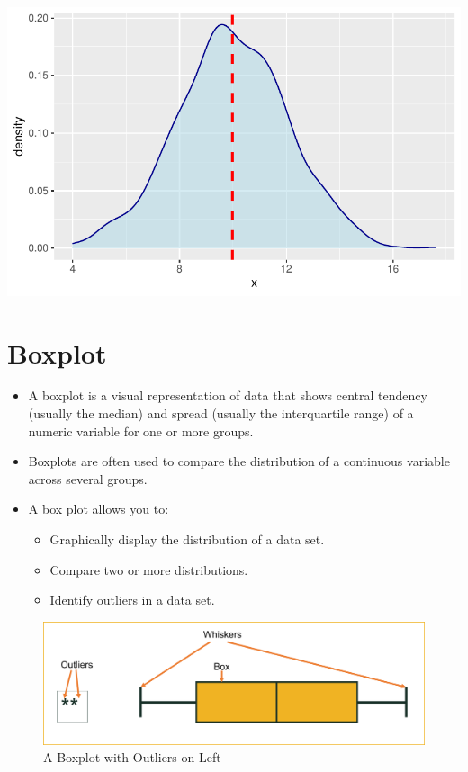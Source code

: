 \documentclass[
  letterpaper,
  DIV=11,
  numbers=noendperiod]{scrreprt}
\providecommand{\tightlist}{%
  \setlength{\itemsep}{0pt}\setlength{\parskip}{0pt}}\usepackage{longtable,booktabs,array}
\begin{document}
\includegraphics{dataviz_files/figure-pdf/unnamed-chunk-24-1.pdf}

\section{Boxplot}\label{boxplot}

\begin{itemize}
\item
  A boxplot is a visual representation of data that shows central
  tendency (usually the median) and spread (usually the interquartile
  range) of a numeric variable for one or more groups.
\item
  Boxplots are often used to compare the distribution of a continuous
  variable across several groups.
\item
  A box plot allows you to:

  \begin{itemize}
  \tightlist
  \item
    Graphically display the distribution of a data set.
  \item
    Compare two or more distributions.
  \item
    Identify outliers in a data set.
  \end{itemize}
\end{itemize}

\begin{figure}[H]

{\centering \includegraphics{Pictures/Ch3/Boxplot.png}

}

\caption{A Boxplot with Outliers on Left}

\end{figure}%
\end{document}

